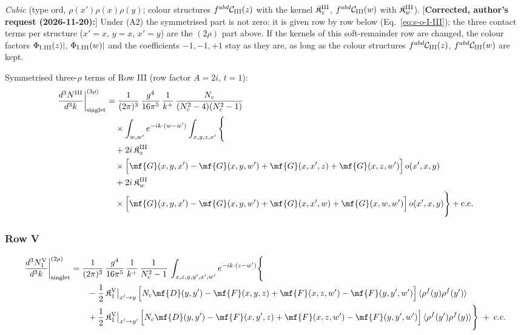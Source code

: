 {\emph{Cubic} (type ord, $\rho(x')\rho(x)\rho(y)$; colour structures $f^{abd}\mathcal{C}_{\rm III}(z)$ with the kernel $\mathfrak{K}^{\rm III}_{z}$, $f^{abd}\mathcal{C}_{\rm III}(w)$ with $\mathfrak{K}^{\rm III}_{w}$). [\textbf{Corrected, author's request (2026-11-20):}] Under (A2) the symmetrised part is not zero: it is given row by row below (Eq.~\eqref{eq:s-o-I-III}); the three contact terms per structure ($x'=x$, $y=x$, $x'=y$) are the $(2\rho)$ part above. If the kernels of this soft-remainder row are changed, the colour factors $\Phi_{\rm I.III}(z)|$, $\Phi_{\rm I.III}(w)|$ and the coefficients $-1,-1,+1$ stay as they are, as long as the colour structures $f^{abd}\mathcal{C}_{\rm III}(z)$, $f^{abd}\mathcal{C}_{\rm III}(w)$ are kept.

 Symmetrised three-$\rho$ terms of Row III (row factor $A=2i$, $t=1$):
\begin{align}
\frac{d^{3}N^{\rm III}}{d^{3}k}\bigg|^{(3\rho)}_{\rm singlet}&=\frac{1}{(2\pi)^{3}}\,\frac{g^{4}}{16\pi^{5}}\,\frac{1}{k^{+}}\,\frac{N_{c}}{(N_{c}^{2}-4)(N_{c}^{2}-1)}\notag\\
&\quad\times\int_{w,w'}e^{-ik\cdot(w-w')}\int_{x,y,z,x'}\Bigg\{\notag\\
&\quad+2i\,\mathfrak{K}^{\rm III}_{z}\notag\\
&\quad\times\Big[\mf{G}(x,y,x')-\mf{G}(x,y,w')+\mf{G}(x,x',z)+\mf{G}(x,z,w')\Big]\,o(x',x,y)\notag\\
&\quad+2i\,\mathfrak{K}^{\rm III}_{w}\notag\\
&\quad\times\Big[\mf{G}(x,y,x')-\mf{G}(x,y,w')+\mf{G}(x,x',w)+\mf{G}(x,w,w')\Big]\,o(x',x,y)\Bigg\}+{\rm c.c.}\label{eq:s-o-I-III}
\end{align}

\subsubsection*{Row V}

\begin{align}
\frac{d^{3}N_{1}^{\rm V}}{d^{3}k}\bigg|^{(2\rho)}_{\rm singlet}&=\frac{1}{(2\pi)^{3}}\,\frac{g^{4}}{16\pi^{5}}\,\frac{1}{k^{+}}\,\frac{1}{N_{c}^{2}-1}\,\int_{x,z,y,y',x',w'}e^{-ik\cdot(z-w')}\Bigg\{\notag\\
&\qquad -\frac{1}{2}\,\mathfrak{K}^{\rm V}_{1}\big|_{x'\to y}\,\Big[N_{c}\mf{D}(y,y')-\mf{F}(x,y,z)+\mf{F}(x,z,w')-\mf{F}(y,y',w')\Big]\,\langle\rho^{f}(y)\rho^{f}(y')\rangle\notag\\
&\qquad +\frac{1}{2}\,\mathfrak{K}^{\rm V}_{1}\big|_{x'\to y'}\,\Big[N_{c}\mf{D}(y,y')-\mf{F}(x,y',z)+\mf{F}(x,z,w')-\mf{F}(y,y',w')\Big]\,\langle\rho^{f}(y')\rho^{f}(y)\rangle\Bigg\}\;+\;{\rm c.c.}\label{eq:s-I-V-1}
\end{align}

}

